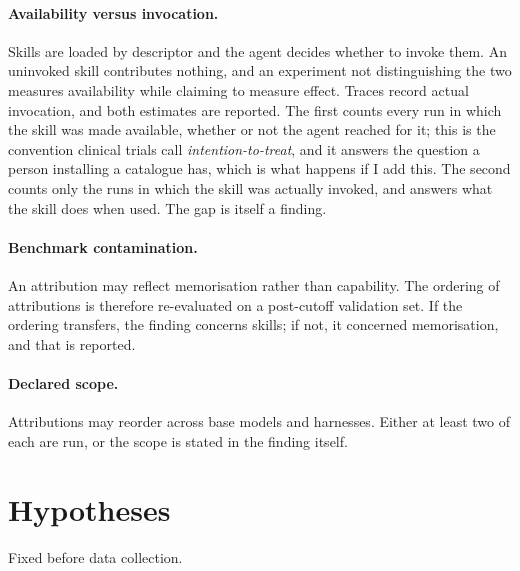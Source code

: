 \documentclass[11pt]{article}
\theoremstyle{plain}
\theoremstyle{definition}
\theoremstyle{remark}
\begin{document}
\paragraph{Availability versus invocation.} Skills are loaded by descriptor and the agent decides whether to invoke them. An uninvoked skill contributes nothing, and an experiment not distinguishing the two measures availability while claiming to measure effect. Traces record actual invocation, and both estimates are reported. The first counts every run in which the skill was made available, whether or not the agent reached for it; this is the convention clinical trials call \emph{intention-to-treat}, and it answers the question a person installing a catalogue has, which is what happens if I add this. The second counts only the runs in which the skill was actually invoked, and answers what the skill does when used. The gap is itself a finding.

\paragraph{Benchmark contamination.} An attribution may reflect memorisation rather than capability. The ordering of attributions is therefore re-evaluated on a post-cutoff validation set. If the ordering transfers, the finding concerns skills; if not, it concerned memorisation, and that is reported.

\paragraph{Declared scope.} Attributions may reorder across base models and harnesses. Either at least two of each are run, or the scope is stated in the finding itself.

\section{Hypotheses}

Fixed before data collection.
\end{document}
